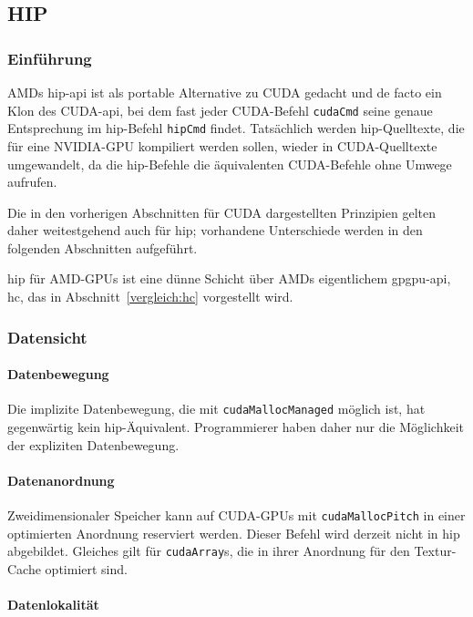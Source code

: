 \subsection{HIP}

\subsubsection{Einführung}

AMDs \gls{hip}-\gls{api} ist als portable Alternative zu CUDA gedacht und de
facto ein Klon des CUDA-\gls{api}, bei dem fast jeder CUDA-Befehl
\texttt{cudaCmd} seine genaue Entsprechung im \gls{hip}-Befehl \texttt{hipCmd}
findet. Tatsächlich werden \gls{hip}-Quelltexte, die für eine NVIDIA-GPU
kompiliert werden sollen, wieder in CUDA-Quelltexte umgewandelt, da die
\gls{hip}-Befehle die äquivalenten CUDA-Befehle ohne Umwege aufrufen.

Die in den vorherigen Abschnitten für CUDA dargestellten Prinzipien gelten daher
weitestgehend auch für \gls{hip}; vorhandene Unterschiede werden in den
folgenden Abschnitten aufgeführt.

\gls{hip} für AMD-GPUs ist eine dünne Schicht über AMDs eigentlichem
\gls{gpgpu}-\gls{api}, \gls{hc}, das in Abschnitt~\ref{vergleich:hc} vorgestellt
wird.

\subsubsection{Datensicht}

\paragraph{Datenbewegung}

Die implizite Datenbewegung, die mit \texttt{cudaMallocManaged} möglich ist,
hat gegenwärtig kein \gls{hip}-Äquivalent. Programmierer haben daher nur die
Möglichkeit der expliziten Datenbewegung.

\paragraph{Datenanordnung}

Zweidimensionaler Speicher kann auf CUDA-GPUs mit \texttt{cudaMallocPitch} in
einer optimierten Anordnung reserviert werden. Dieser Befehl wird derzeit nicht
in \gls{hip} abgebildet. Gleiches gilt für \texttt{cudaArray}s, die in ihrer
Anordnung für den Textur-Cache optimiert sind.

\paragraph{Datenlokalität}

